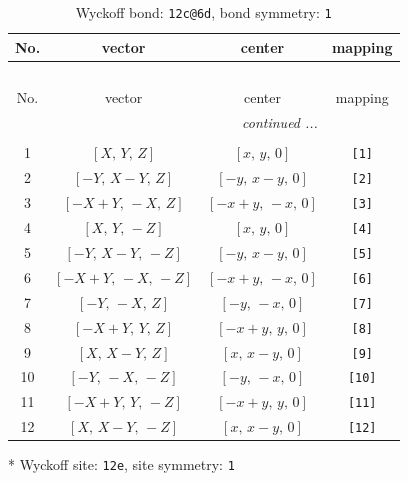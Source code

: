 \documentclass[fleqn,8pt]{jsarticle}
\begin{document}
\begin{longtable}{cccc}
\caption{Wyckoff bond: {\tt 12c@6d}, bond symmetry: {\tt 1}}
 \\
 \hline \hline
No. & vector & center & mapping \\ \hline \endfirsthead

\multicolumn{3}{l}{\tablename\ \thetable{}} \\
 \hline \hline
No. & vector & center & mapping \\ \hline \endhead

 \hline \hline
\multicolumn{3}{r}{\footnotesize\it continued ...} \\ \endfoot

 \hline \hline
\multicolumn{3}{r}{} \\ \endlastfoot

1 & $\left[ X,\, Y,\, Z \right]$ & $\left[ x,\, y,\, 0 \right]$ & {\tt [1]} \\ \hline
2 & $\left[ - Y,\, X - Y,\, Z \right]$ & $\left[ - y,\, x - y,\, 0 \right]$ & {\tt [2]} \\ \hline
3 & $\left[ - X + Y,\, - X,\, Z \right]$ & $\left[ - x + y,\, - x,\, 0 \right]$ & {\tt [3]} \\ \hline
4 & $\left[ X,\, Y,\, - Z \right]$ & $\left[ x,\, y,\, 0 \right]$ & {\tt [4]} \\ \hline
5 & $\left[ - Y,\, X - Y,\, - Z \right]$ & $\left[ - y,\, x - y,\, 0 \right]$ & {\tt [5]} \\ \hline
6 & $\left[ - X + Y,\, - X,\, - Z \right]$ & $\left[ - x + y,\, - x,\, 0 \right]$ & {\tt [6]} \\ \hline
7 & $\left[ - Y,\, - X,\, Z \right]$ & $\left[ - y,\, - x,\, 0 \right]$ & {\tt [7]} \\ \hline
8 & $\left[ - X + Y,\, Y,\, Z \right]$ & $\left[ - x + y,\, y,\, 0 \right]$ & {\tt [8]} \\ \hline
9 & $\left[ X,\, X - Y,\, Z \right]$ & $\left[ x,\, x - y,\, 0 \right]$ & {\tt [9]} \\ \hline
10 & $\left[ - Y,\, - X,\, - Z \right]$ & $\left[ - y,\, - x,\, 0 \right]$ & {\tt [10]} \\ \hline
11 & $\left[ - X + Y,\, Y,\, - Z \right]$ & $\left[ - x + y,\, y,\, 0 \right]$ & {\tt [11]} \\ \hline
12 & $\left[ X,\, X - Y,\, - Z \right]$ & $\left[ x,\, x - y,\, 0 \right]$ & {\tt [12]} \\
\end{longtable}
* Wyckoff site: {\tt 12e}, site symmetry: {\tt 1}
\renewcommand{\arraystretch}{1.2}
\end{document}
